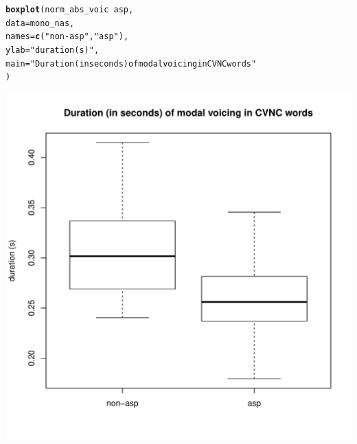 \documentclass[a4paper,11pt]{article}\usepackage[]{graphicx}\usepackage[]{color}
\makeatletter
\def\maxwidth{ %
  \ifdim\Gin@nat@width>\linewidth
    \linewidth
  \else
    \Gin@nat@width
  \fi
}
\newcommand{\hlstr}[1]{\textcolor[rgb]{0.192,0.494,0.8}{#1}}%
\newcommand{\hlopt}[1]{\textcolor[rgb]{0,0,0}{#1}}%
\newcommand{\hlstd}[1]{\textcolor[rgb]{0.345,0.345,0.345}{#1}}%
\newcommand{\hlkwc}[1]{\textcolor[rgb]{0.333,0.667,0.333}{#1}}%
\newcommand{\hlkwd}[1]{\textcolor[rgb]{0.737,0.353,0.396}{\textbf{#1}}}%
\newenvironment{kframe}{%
 \def\at@end@of@kframe{}%
 \ifinner\ifhmode%
  \def\at@end@of@kframe{\end{minipage}}%
  \begin{minipage}{\columnwidth}%
 \fi\fi%
 \def\FrameCommand##1{\hskip\@totalleftmargin \hskip-\fboxsep
 \colorbox{shadecolor}{##1}\hskip-\fboxsep
     \hskip-\linewidth \hskip-\@totalleftmargin \hskip\columnwidth}%
 \MakeFramed {\advance\hsize-\width
   \@totalleftmargin\z@ \linewidth\hsize
   \@setminipage}}%
 {\par\unskip\endMakeFramed%
 \at@end@of@kframe}
\newenvironment{knitrout}{}{} %
\makeatother
\begin{document}
\begin{knitrout}
\color{fgcolor}\begin{kframe}
\begin{alltt}
\hlkwd{boxplot}\hlstd{(norm_abs_voic} \hlopt{~} \hlstd{asp,}
        \hlkwc{data} \hlstd{= mono_nas,}
        \hlkwc{names} \hlstd{=} \hlkwd{c}\hlstd{(}\hlstr{"non-asp"}\hlstd{,} \hlstr{"asp"}\hlstd{),}
        \hlkwc{ylab} \hlstd{=} \hlstr{"duration (s)"}\hlstd{,}
        \hlkwc{main} \hlstd{=} \hlstr{"Duration (in seconds) of modal voicing in CVNC words"}
        \hlstd{)}
\end{alltt}
\end{kframe}

{\centering \includegraphics[width=\maxwidth]{img/mono-nas-box-1} 

}



\end{knitrout}
\end{document}
